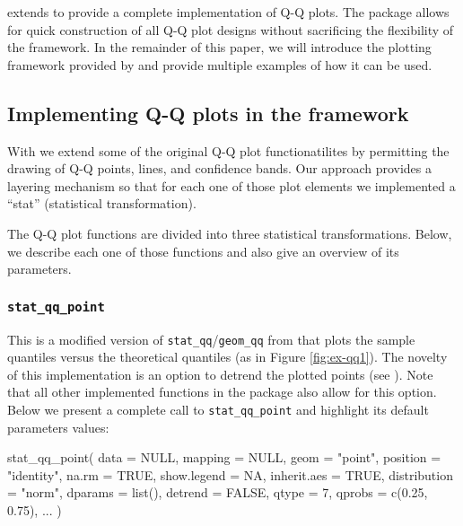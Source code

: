  extends  to provide a complete implementation
of Q-Q plots. The package allows for quick construction of all Q-Q plot
designs without sacrificing the flexibility of the 
framework. In the remainder of this paper, we will introduce the
plotting framework provided by  and provide multiple
examples of how it can be used.

\subsection{\texorpdfstring{Implementing Q-Q plots in the 
framework}{Implementing Q-Q plots in the  framework}}\label{implementing-q-q-plots-in-the-framework}

\label{sec:implementing}

With  we extend some of the original  Q-Q plot
functionatilites by permitting the drawing of Q-Q points, lines, and
confidence bands. Our approach provides a  layering
mechanism so that for each one of those plot elements we implemented a
 ``stat'' (statistical transformation).

The Q-Q plot functions are divided into three statistical
transformations. Below, we describe each one of those functions and also
give an overview of its parameters.

\subsubsection{\texorpdfstring{\texttt{stat\_qq\_point}}{stat\_qq\_point}}\label{stat_qq_point}

This is a modified version of \texttt{stat\_qq}/\texttt{geom\_qq} from
 that plots the sample quantiles versus the theoretical
quantiles (as in Figure \ref{fig:ex-qq1}). The novelty of this
implementation is an option to detrend the plotted points (see
). Note that all other implemented functions in
the  package also allow for this option. Below we present a
complete call to \texttt{stat\_qq\_point} and highlight its default
parameters values:

\begin{Schunk}
\begin{Sinput}
stat_qq_point(
  data = NULL,
  mapping = NULL,
  geom = "point",
  position = "identity",
  na.rm = TRUE,
  show.legend = NA,
  inherit.aes = TRUE,
  distribution = "norm",
  dparams = list(),
  detrend = FALSE,
  qtype = 7,
  qprobs = c(0.25, 0.75),
  ...
  )
\end{Sinput}
\end{Schunk}

